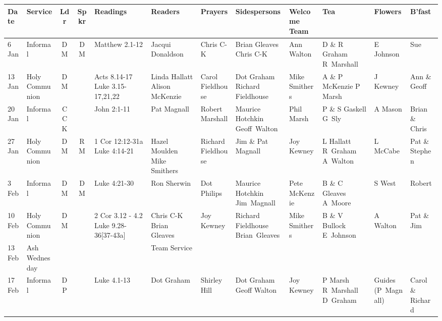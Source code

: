 \documentclass[10pt]{article}
\begin{document}
\begin{center}
{\begin{tabular}{|%
p{}| %
p{}| %
c| %
c| %
X{}| %
X{}| %
p{}| %
X{}| %
X{}| %
X{}| %
p{}| %
p{}|}\hline %
 Date & Service & Ldr & Spkr & Readings & Readers & Prayers &
Sidespersons & Welcome Team & Tea &  Flowers & B'fast   \\ \hline %
\hline
6 Jan & Informal & DM & DM &  Matthew 2.1-12  & Jacqui Donaldson & Chris C-K & Brian Gleaves Chris C-K   & Ann Walton &  D \& R Graham R~Marshall & E Johnson & Sue \\ \hline
13 Jan & Holy Communion & DM &  & Acts 8.14-17 Luke 3.15-17,21,22 & Linda Hallatt Alison McKenzie & Carol Fieldhouse & Dot Graham  Richard Fieldhouse  & Mike Smithers  &  A \& P McKenzie P Marsh & J Kewney & Ann \& Geoff \\ \hline
20 Jan & Informal & CCK &  &  John 2:1-11  & Pat Magnall & Robert Marshall & Maurice Hotchkin Geoff~Walton & Phil Marsh &   P \& S Gaskell G~Sly  & A Mason & Brian \& Chris \\ \hline
27 Jan & Holy Communion & DM & RM & 1 Cor 12:12-31a Luke 4:14-21 & Hazel Moulden Mike Smithers & Richard Fieldhouse & Jim \& Pat Magnall   & Joy Kewney & L Hallatt R~Graham A~Walton & L McCabe & Pat \& Stephen \\ \hline
3 Feb & Informal & DM & DM & Luke 4:21-30  & Ron Sherwin & Dot Philips & Maurice Hotchkin Jim~Magnall  & Pete McKenzie &  B \& C Gleaves A~Moore  & S West & Robert \\ \hline
10 Feb & Holy Communion & DM &  & 2 Cor 3.12 - 4.2 Luke 9.28-36[37-43a] & Chris C-K Brian Gleaves & Joy Kewney & Richard Fieldhouse Brian~Gleaves & Mike Smithers  & B \& V Bullock E~Johnson & A Walton & Pat \& Jim \\ \hline
13 Feb & Ash Wednesday &  &  & \multicolumn{1}{l|}{} & Team Service &  &  &  &  &  &  \\ \hline
17 Feb & Informal & DP &  & Luke 4.1-13 & Dot Graham & Shirley Hill & Dot Graham Geoff Walton & Joy Kewney & P Marsh  R~Marshall D~Graham & Guides (P~Magnall) & Carol \& Richard \\ \hline

\end{tabular}}
\end{center}
\end{document}
